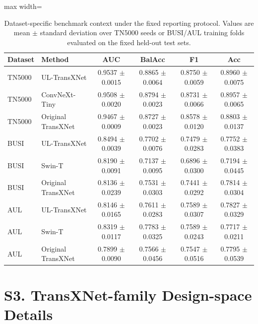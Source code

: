\documentclass[preprint,12pt]{elsarticle}
\newcommand{\suppsection}[1]{\Needspace{0.35\textheight}\section*{#1}}
\begin{document}
\begin{table}[H]
    \centering
    \small
    \caption{Dataset-specific benchmark context under the fixed reporting protocol. Values are mean $\pm$ standard deviation over TN5000 seeds or BUSI/AUL training folds evaluated on the fixed held-out test sets.}
    \label{tab:s_main_context}
    \begin{adjustbox}{max width=\columnwidth}
    \begin{tabular}{llcccc}
        \toprule
        Dataset & Method & AUC & BalAcc & F1 & Acc \\
        \midrule
        TN5000 & UL-TransXNet & 0.9537 $\pm$ 0.0015 & 0.8865 $\pm$ 0.0064 & 0.8750 $\pm$ 0.0059 & 0.8960 $\pm$ 0.0075 \\
        TN5000 & ConvNeXt-Tiny & 0.9508 $\pm$ 0.0020 & 0.8794 $\pm$ 0.0023 & 0.8731 $\pm$ 0.0066 & 0.8957 $\pm$ 0.0065 \\
        TN5000 & Original TransXNet & 0.9467 $\pm$ 0.0009 & 0.8727 $\pm$ 0.0023 & 0.8578 $\pm$ 0.0120 & 0.8803 $\pm$ 0.0137 \\
        \midrule
        BUSI & UL-TransXNet & 0.8494 $\pm$ 0.0039 & 0.7702 $\pm$ 0.0076 & 0.7479 $\pm$ 0.0283 & 0.7752 $\pm$ 0.0383 \\
        BUSI & Swin-T & 0.8190 $\pm$ 0.0091 & 0.7137 $\pm$ 0.0095 & 0.6896 $\pm$ 0.0300 & 0.7194 $\pm$ 0.0445 \\
        BUSI & Original TransXNet & 0.8136 $\pm$ 0.0239 & 0.7531 $\pm$ 0.0303 & 0.7441 $\pm$ 0.0292 & 0.7814 $\pm$ 0.0304 \\
        \midrule
        AUL & UL-TransXNet & 0.8146 $\pm$ 0.0165 & 0.7611 $\pm$ 0.0283 & 0.7589 $\pm$ 0.0307 & 0.7827 $\pm$ 0.0329 \\
        AUL & Swin-T & 0.8319 $\pm$ 0.0117 & 0.7783 $\pm$ 0.0325 & 0.7589 $\pm$ 0.0243 & 0.7717 $\pm$ 0.0211 \\
        AUL & Original TransXNet & 0.7899 $\pm$ 0.0090 & 0.7566 $\pm$ 0.0456 & 0.7547 $\pm$ 0.0516 & 0.7795 $\pm$ 0.0539 \\
        \bottomrule
    \end{tabular}
    \end{adjustbox}
\end{table}

\suppsection{S3. TransXNet-family Design-space Details}
\end{document}
